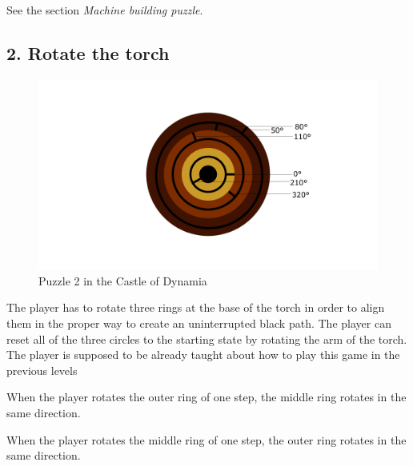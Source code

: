 %

%

See the section \textit{Machine building puzzle}.


\subsection{2. Rotate the torch}

\begin{figure}[H]
  \centering
  \includegraphics[width=\textwidth]{Images/Puzzles/castleOfDynamia2}
  \caption{Puzzle 2 in the Castle of Dynamia}
\end{figure}

The player has to rotate three rings at the base of the torch in order to align them in the proper way to create an uninterrupted black path. The player can reset all of the three circles to the starting state by rotating the arm of the torch. The player is supposed to be already taught about how to play this game in the previous levels

When the player rotates the outer ring of one step, the middle ring rotates in the same direction.

When the player rotates the middle ring of one step, the outer ring rotates in the same direction.

